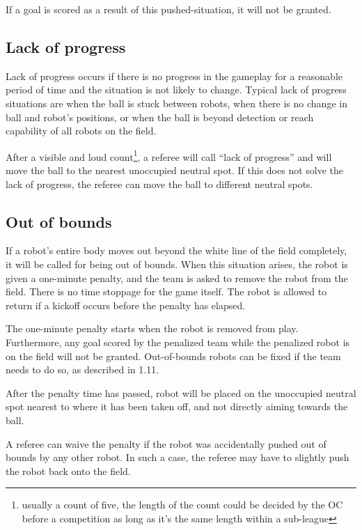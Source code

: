 \documentclass{article}
\begin{document}
If a goal is scored as a result of this pushed-situation, it will not be granted.

\subsection{Lack of progress \label{ref-010}}

Lack of progress occurs if there is no progress in the gameplay for a reasonable period of time and the situation is not likely to change. Typical lack of progress situations are when the ball is stuck between robots, when there is no change in ball and robot's positions, or when the ball is beyond detection or reach capability of all robots on the field.

After a visible and loud count\footnote{usually a count of five, the length of the count could be decided by the OC before a competition as long as it's the same length within a sub-league}, a referee will call ``lack of progress'' and will move the ball to the nearest unoccupied neutral spot. If this does not solve the lack of progress, the referee can move the ball to different neutral spots.

\subsection{Out of bounds \label{ref-011}}

If a robot's entire body moves out beyond the white line of the field completely, it will be called for being out of bounds. When this situation arises, the robot is given a one-minute penalty, and the team is asked to remove the robot from the field. There is no time stoppage for the game itself. The robot is allowed to return if a kickoff occurs before the penalty has elapsed.

The one-minute penalty starts when the robot is removed from play. Furthermore, any goal scored by the penalized team while the penalized robot is on the field will not be granted. Out-of-bounds robots can be fixed if the team needs to do so, as described in 1.11.

After the penalty time has passed, robot will be placed on the unoccupied neutral spot nearest to where it has been taken off, and not directly aiming towards the ball.

A referee can waive the penalty if the robot was accidentally pushed out of bounds by any other robot. In such a case, the referee may have to slightly push the robot back onto the field.
\end{document}
